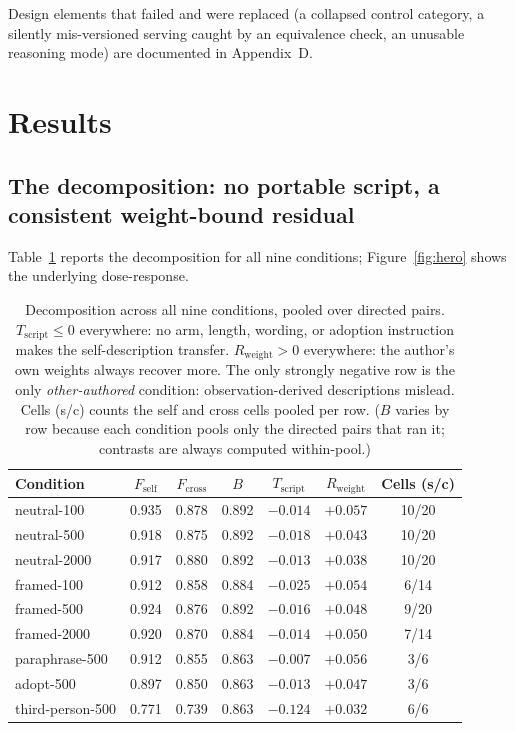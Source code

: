 \documentclass[11pt]{article}
\newcommand{\Fself}{F_{\mathrm{self}}}
\newcommand{\Fcross}{F_{\mathrm{cross}}}
\newcommand{\B}{B}
\newcommand{\Tscript}{T_{\mathrm{script}}}
\newcommand{\Rweight}{R_{\mathrm{weight}}}
\begin{document}
Design elements that failed and were replaced (a collapsed control category, a
silently mis-versioned serving caught by an equivalence check, an unusable
reasoning mode) are documented in Appendix~D.

\section{Results}
\subsection{The decomposition: no portable script, a consistent weight-bound residual}
Table~\ref{tab:decomp} reports the decomposition for all nine conditions;
Figure~\ref{fig:hero} shows the underlying dose-response.
\begin{table}[h]
\centering\small
\begin{tabular}{lcccccc}
\toprule
Condition & $\Fself$ & $\Fcross$ & $\B$ & $\Tscript$ & $\Rweight$ & Cells (s/c) \\
\midrule
neutral-100  & 0.935 & 0.878 & 0.892 & $-0.014$ & $+0.057$ & 10/20 \\
neutral-500  & 0.918 & 0.875 & 0.892 & $-0.018$ & $+0.043$ & 10/20 \\
neutral-2000 & 0.917 & 0.880 & 0.892 & $-0.013$ & $+0.038$ & 10/20 \\
framed-100   & 0.912 & 0.858 & 0.884 & $-0.025$ & $+0.054$ & 6/14 \\
framed-500   & 0.924 & 0.876 & 0.892 & $-0.016$ & $+0.048$ & 9/20 \\
framed-2000  & 0.920 & 0.870 & 0.884 & $-0.014$ & $+0.050$ & 7/14 \\
paraphrase-500 & 0.912 & 0.855 & 0.863 & $-0.007$ & $+0.056$ & 3/6 \\
adopt-500    & 0.897 & 0.850 & 0.863 & $-0.013$ & $+0.047$ & 3/6 \\
third-person-500 & 0.771 & 0.739 & 0.863 & $-0.124$ & $+0.032$ & 6/6 \\
\bottomrule
\end{tabular}
\caption{Decomposition across all nine conditions, pooled over directed pairs.
$\Tscript \le 0$ everywhere: no arm, length, wording, or adoption instruction
makes the self-description transfer. $\Rweight > 0$ everywhere: the author's
own weights always recover more. The only strongly negative row is the only
\emph{other-authored} condition: observation-derived descriptions mislead.
Cells (s/c) counts the self and cross cells pooled per row. ($\B$ varies by
row because each condition pools only the directed pairs that ran it;
contrasts are always computed within-pool.)}
\label{tab:decomp}
\end{table}
\end{document}
